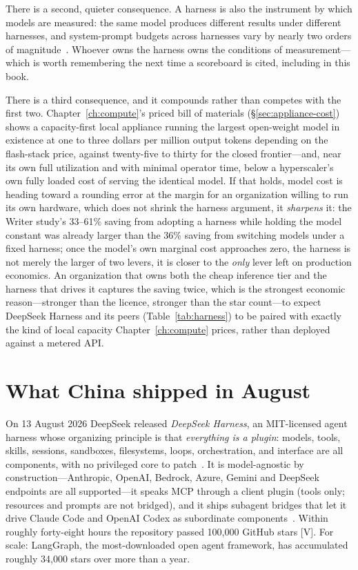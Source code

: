 There is a second, quieter consequence. A harness is also the instrument by which models are measured: the same model produces different results under different harnesses, and system-prompt budgets across harnesses vary by nearly two orders of magnitude~\cite{harness-register}. Whoever owns the harness owns the conditions of measurement---which is worth remembering the next time a scoreboard is cited, including in this book.

There is a third consequence, and it compounds rather than competes with the first two. Chapter~\ref{ch:compute}'s priced bill of materials (\S\ref{sec:appliance-cost}) shows a capacity-first local appliance running the largest open-weight model in existence at one to three dollars per million output tokens depending on the flash-stack price, against twenty-five to thirty for the closed frontier---and, near its own full utilization and with minimal operator time, below a hyperscaler's own fully loaded cost of serving the identical model. If that holds, model cost is heading toward a rounding error at the margin for an organization willing to run its own hardware, which does not shrink the harness argument, it \emph{sharpens} it: the Writer study's 33--61\% saving from adopting a harness while holding the model constant was already larger than the 36\% saving from switching models under a fixed harness; once the model's own marginal cost approaches zero, the harness is not merely the larger of two levers, it is closer to the \emph{only} lever left on production economics. An organization that owns both the cheap inference tier and the harness that drives it captures the saving twice, which is the strongest economic reason---stronger than the licence, stronger than the star count---to expect DeepSeek Harness and its peers (Table~\ref{tab:harness}) to be paired with exactly the kind of local capacity Chapter~\ref{ch:compute} prices, rather than deployed against a metered API.

\section{What China shipped in August}
\label{sec:china-harness}

On 13 August 2026 DeepSeek released \emph{DeepSeek Harness}, an MIT-licensed agent harness whose organizing principle is that \emph{everything is a plugin}: models, tools, skills, sessions, sandboxes, filesystems, loops, orchestration, and interface are all components, with no privileged core to patch~\cite{dsh-repo,dsh-official}. It is model-agnostic by construction---Anthropic, OpenAI, Bedrock, Azure, Gemini and DeepSeek endpoints are all supported---it speaks MCP through a client plugin (tools only; resources and prompts are not bridged), and it ships subagent bridges that let it drive Claude Code and OpenAI Codex as subordinate components~\cite{dsh-mcp,dsh-newstack}. Within roughly forty-eight hours the repository passed 100{,}000 GitHub stars [V]. For scale: LangGraph, the most-downloaded open agent framework, has accumulated roughly 34{,}000 stars over more than a year.

